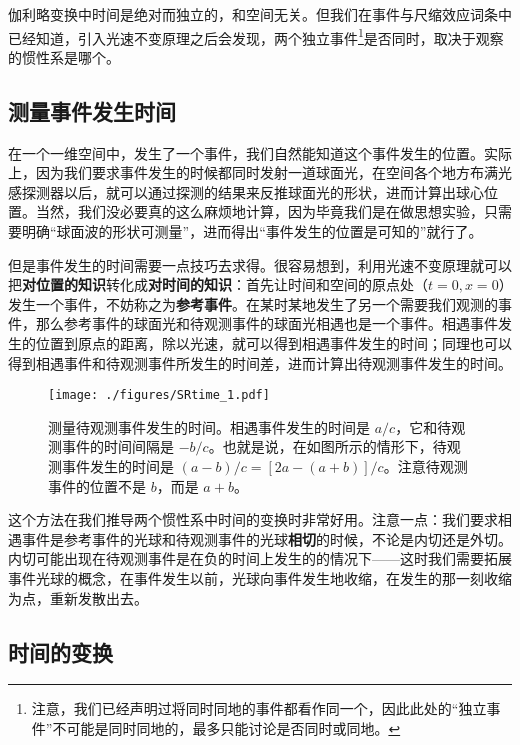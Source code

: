 

伽利略变换中时间是绝对而独立的，和空间无关。但我们在事件与尺缩效应词条中已经知道，引入光速不变原理之后会发现，两个独立事件\footnote{注意，我们已经声明过将同时同地的事件都看作同一个，因此此处的“独立事件”不可能是同时同地的，最多只能讨论是否同时或同地。}是否同时，取决于观察的惯性系是哪个。

\subsection{测量事件发生时间}

在一个一维空间中，发生了一个事件，我们自然能知道这个事件发生的位置。实际上，因为我们要求事件发生的时候都同时发射一道球面光，在空间各个地方布满光感探测器以后，就可以通过探测的结果来反推球面光的形状，进而计算出球心位置。当然，我们没必要真的这么麻烦地计算，因为毕竟我们是在做思想实验，只需要明确“球面波的形状可测量”，进而得出“事件发生的位置是可知的”就行了。

但是事件发生的时间需要一点技巧去求得。很容易想到，利用光速不变原理就可以把\textbf{对位置的知识}转化成\textbf{对时间的知识}：首先让时间和空间的原点处（$t=0, x=0$）发生一个事件，不妨称之为\textbf{参考事件}。在某时某地发生了另一个需要我们观测的事件，那么参考事件的球面光和待观测事件的球面光相遇也是一个事件。相遇事件发生的位置到原点的距离，除以光速，就可以得到相遇事件发生的时间；同理也可以得到相遇事件和待观测事件所发生的时间差，进而计算出待观测事件发生的时间。

\begin{figure}[ht]
\centering
\texttt{[image: ./figures/SRtime\_1.pdf]}
\caption{测量待观测事件发生的时间。相遇事件发生的时间是 $a/c$，它和待观测事件的时间间隔是 $-b/c$。也就是说，在如图所示的情形下，待观测事件发生的时间是 $(a-b)/c=[2a-(a+b)]/c$。注意待观测事件的位置不是 $b$，而是 $a+b$。} \label{SRtime_fig1}
\end{figure}

这个方法在我们推导两个惯性系中时间的变换时非常好用。注意一点：我们要求相遇事件是参考事件的光球和待观测事件的光球\textbf{相切}的时候，不论是内切还是外切。内切可能出现在待观测事件是在负的时间上发生的的情况下——这时我们需要拓展事件光球的概念，在事件发生以前，光球向事件发生地收缩，在发生的那一刻收缩为点，重新发散出去。

\subsection{时间的变换}

